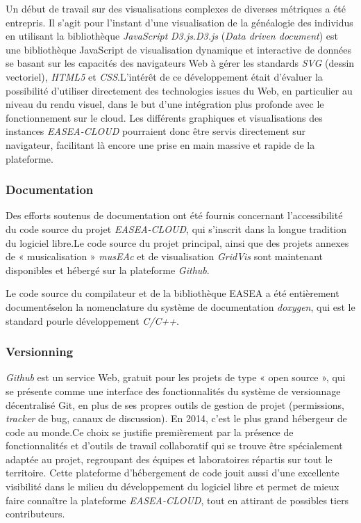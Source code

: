 \documentclass[french, 11pt]{memoir}
\begin{document}
Un début de travail sur des visualisations complexes de diverses
métriques a été entrepris. Il s'agit pour l'instant d'une visualisation
de la généalogie des individus en utilisant la bibliothèque
\emph{JavaScript} \emph{D3.js}.\emph{D3.js} (\emph{Data driven
	document}) est une bibliothèque JavaScript de visualisation dynamique et
interactive de données se basant sur les capacités des navigateurs Web à
gérer les standards \emph{SVG} (dessin vectoriel), \emph{HTML5} et
\emph{CSS}.L'intérêt de ce développement était d'évaluer la possibilité
d'utiliser directement des technologies issues du Web, en particulier au
niveau du rendu visuel, dans le but d'une intégration plus profonde avec
le fonctionnement sur le cloud. Les différents graphiques et
visualisations des instances \emph{EASEA-CLOUD }pourraient donc être
servis directement sur navigateur, facilitant là encore une prise en
main massive et rapide de la plateforme.

\subsubsection{Documentation}\label{documentation}

Des efforts soutenus de documentation ont été fournis concernant
l'accessibilité du code source du projet \emph{EASEA-CLOUD}, qui
s'inscrit dans la longue tradition du logiciel libre.Le code source du
projet principal, ainsi que des projets annexes de « musicalisation »
\emph{musEAc} et de visualisation \emph{GridVis} sont maintenant
disponibles et hébergé sur la plateforme \emph{Github}.

Le code source du compilateur et de la bibliothèque EASEA a été
entièrement documentéselon la nomenclature du système de documentation
\emph{doxygen}, qui est le standard pourle développement \emph{C/C++}.

\subsubsection{Versionning}\label{versionning}

\emph{Github} est un service Web, gratuit pour les projets de type «
open source », qui se présente comme une interface des fonctionnalités
du système de versionnage décentralisé Git, en plus de ses propres
outils de gestion de projet (permissions, \emph{tracker} de bug, canaux
de discussion). En 2014, c'est le plus grand hébergeur de code au
monde.Ce choix se justifie premièrement par la présence de
fonctionnalités et d'outils de travail collaboratif qui se trouve être
spécialement adaptée au projet, regroupant des équipes et laboratoires
répartis sur tout le territoire. Cette plateforme d'hébergement de code
jouit aussi d'une excellente visibilité dans le milieu du développement
du logiciel libre et permet de mieux faire connaître la plateforme
\emph{EASEA-CLOUD}, tout en attirant de possibles tiers contributeurs.
\end{document}
